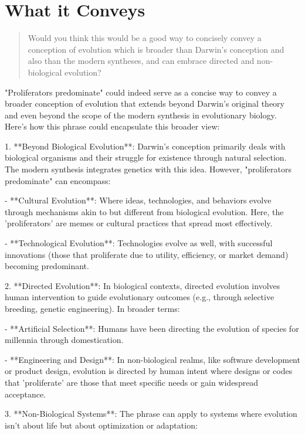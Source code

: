 \documentclass[12pt,titlepage]{book}
\begin{document}
\section{What it Conveys}

\begin{quote}
Would you think this would be a good way to concisely convey a conception of evolution which is broader than Darwin's conception and also than the modern syntheses, and can embrace directed and non-biological evolution?
  \end{quote}

"Proliferators predominate" could indeed serve as a concise way to convey a broader conception of evolution that extends beyond Darwin's original theory and even beyond the scope of the modern synthesis in evolutionary biology. Here's how this phrase could encapsulate this broader view:

1. **Beyond Biological Evolution**: Darwin's conception primarily deals with biological organisms and their struggle for existence through natural selection. The modern synthesis integrates genetics with this idea. However, "proliferators predominate" can encompass:

   - **Cultural Evolution**: Where ideas, technologies, and behaviors evolve through mechanisms akin to but different from biological evolution. Here, the 'proliferators' are memes or cultural practices that spread most effectively.

   - **Technological Evolution**: Technologies evolve as well, with successful innovations (those that proliferate due to utility, efficiency, or market demand) becoming predominant.

2. **Directed Evolution**: In biological contexts, directed evolution involves human intervention to guide evolutionary outcomes (e.g., through selective breeding, genetic engineering). In broader terms:

   - **Artificial Selection**: Humans have been directing the evolution of species for millennia through domestication.

   - **Engineering and Design**: In non-biological realms, like software development or product design, evolution is directed by human intent where designs or codes that 'proliferate' are those that meet specific needs or gain widespread acceptance.

3. **Non-Biological Systems**: The phrase can apply to systems where evolution isn't about life but about optimization or adaptation:
\end{document}
